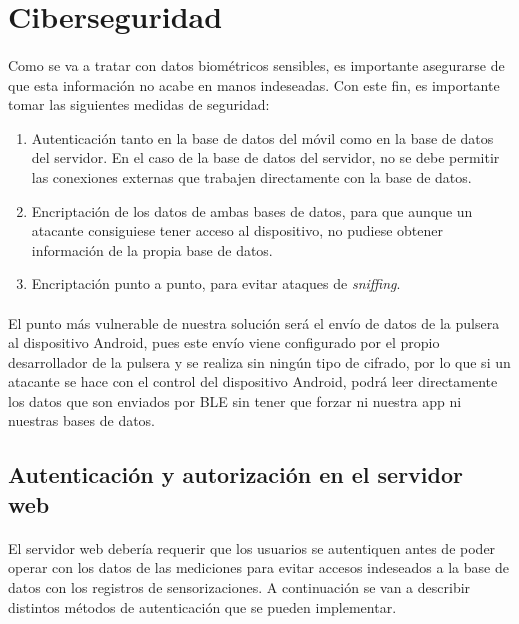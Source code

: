 \section{Ciberseguridad}
\paragraph{}
Como se va a tratar con datos biométricos sensibles, es importante asegurarse de que esta información no acabe en manos indeseadas. Con este fin, es importante tomar las siguientes medidas de seguridad:
\begin{enumerate}
\item Autenticación tanto en la base de datos del móvil como en la base de datos del servidor. En el caso de la base de datos del servidor, no se debe permitir las conexiones externas que trabajen directamente con la base de datos.
\item Encriptación de los datos de ambas bases de datos, para que aunque un atacante consiguiese tener acceso al dispositivo, no pudiese obtener información de la propia base de datos.
\item Encriptación punto a punto, para evitar ataques de \textit{sniffing}.
\end{enumerate}

\paragraph{}
El punto más vulnerable de nuestra solución será el envío de datos de la pulsera al dispositivo Android, pues este envío viene configurado por el propio desarrollador de la pulsera y se realiza sin ningún tipo de cifrado, por lo que si un atacante se hace con el control del dispositivo Android, podrá leer directamente los datos que son enviados por BLE sin tener que forzar ni nuestra app ni nuestras bases de datos.


\subsection{Autenticación y autorización en el servidor web}
\paragraph{}
El servidor web debería requerir que los usuarios se autentiquen antes de poder operar con los datos de las mediciones para evitar accesos indeseados a la base de datos con los registros de sensorizaciones. A continuación se van a describir distintos métodos de autenticación que se pueden implementar.

